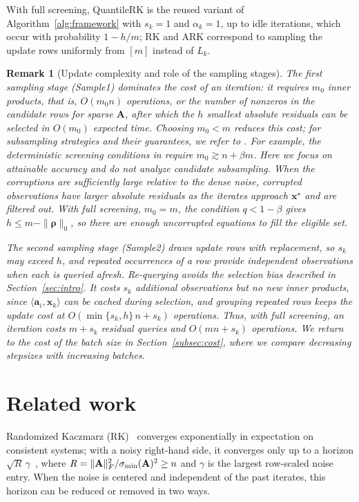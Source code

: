 \documentclass[pdflatex,sn-mathphys-num]{sn-jnl}
\theoremstyle{thmstyleone}
\theoremstyle{thmstylethree}
\newtheorem{remark}{Remark}
\newcommand{\mA}{\mathbf{A}}
\newcommand{\vx}{\mathbf{x}}
\newcommand{\va}{\mathbf{a}}
\begin{document}
With full screening, QuantileRK is the reused variant of
Algorithm~\ref{alg:framework} with $s_k=1$ and $\alpha_k=1$, up to idle
iterations, which occur with probability $1-h/m$; RK and ARK correspond to
sampling the update rows uniformly from $[m]$ instead of $L_k$.

\begin{remark}[Update complexity and role of the sampling stages]
\label{rem:sampling_stages}
The first sampling stage (Sample1) dominates the cost of an iteration: it
requires $m_0$ inner products, that is, $O(m_0n)$ operations, or the number
of nonzeros in the candidate rows for sparse $\mA$, after which the $h$
smallest absolute residuals can be selected in $O(m_0)$ expected time.
Choosing $m_0<m$ reduces this cost; for subsampling strategies and their
guarantees, we refer to
\cite{haddock2022quantilebased,cheng2022block,haddock2023subsampled,cai2026subsample,haddock2026lossfiltering,battaglia2026streaming}.
For example, the deterministic screening conditions in
\cite{haddock2026lossfiltering} require $m_0\gtrsim n+\beta m$. Here we
focus on attainable accuracy and do not analyze candidate subsampling.
When the corruptions are sufficiently large relative to the dense noise,
corrupted observations have larger absolute residuals as the iterates
approach $\vx^\star$ and are filtered out. With full screening, $m_0=m$,
the condition $q<1-\beta$ gives $h\le m-\|\boldsymbol\rho\|_0$, so there
are enough uncorrupted equations to fill the eligible set.

The second sampling stage (Sample2) draws update rows with replacement, so
$s_k$ may exceed $h$, and repeated occurrences of a row provide independent
observations when each is queried afresh. Re-querying avoids the selection
bias described in Section~\ref{sec:intro}. It costs $s_k$ additional
observations but no new inner products, since $\langle\va_i,\vx_k\rangle$ can
be cached during selection, and grouping repeated rows keeps the update cost
at $O(\min\{s_k,h\}\,n+s_k)$ operations. Thus, with full screening, an iteration costs $m+s_k$ residual queries and
$O(mn+s_k)$ operations. We return to the cost of the batch size in
Section~\ref{subsec:cost}, where we compare decreasing stepsizes with
increasing batches. 
\end{remark}

\section{Related work}
\label{sec:related}
Randomized Kaczmarz (RK)~\cite{kaczmarz1973,strohmer2007randomized}
converges exponentially in expectation on consistent systems; with a
noisy right-hand side, it converges only up to a horizon
$\sqrt{R}\,\gamma$~\cite{needell2010}, where
$R=\|{\bf A}\|_F^2/\sigma_{\min}({\bf A})^2\ge n$ and $\gamma$ is the
largest row-scaled noise entry. When the noise is centered and
independent of the past iterates, this horizon can be reduced or removed in
two ways.
\end{document}
